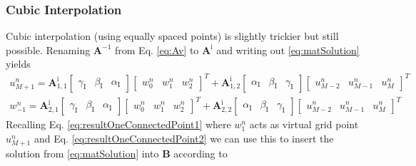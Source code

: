 \documentclass[dvipsnames]{article}
\begin{document}
\subsubsection{Cubic Interpolation}
Cubic interpolation (using equally spaced points) is slightly trickier but still possible. Renaming $\mathbf{A}^{-1}$ from Eq. \eqref{eq:Av} to $\mathbf{A}^\text{i}$ and writing out \eqref{eq:matSolution} yields
\begin{align}
    u_{M+1}^n = \mathbf{A}^\text{i}_{1, 1}\begin{bmatrix}
   \gamma_\text{I} & \beta_\text{I} & \alpha_\text{I}
    \end{bmatrix} \begin{bmatrix}
   w_0^n & w_1^n &w_2^n
    \end{bmatrix}^T + \mathbf{A}^\text{i}_{1, 2}\begin{bmatrix}
   \alpha_\text{I} & \beta_\text{I} & \gamma_\text{I}
    \end{bmatrix} \begin{bmatrix}
   u_{M-2}^n & u_{M-1}^n &u_M^n
    \end{bmatrix}^T\\
    w_{-1}^n = \mathbf{A}^\text{i}_{2, 1}\begin{bmatrix}
   \gamma_\text{I} & \beta_\text{I} & \alpha_\text{I}
    \end{bmatrix} \begin{bmatrix}
   w_0^n & w_1^n &w_2^n
    \end{bmatrix}^T + \mathbf{A}^\text{i}_{2, 2}\begin{bmatrix}
   \alpha_\text{I} & \beta_\text{I} & \gamma_\text{I}
    \end{bmatrix} \begin{bmatrix}
   u_{M-2}^n & u_{M-1}^n &u_M^n
    \end{bmatrix}^T
\end{align}
Recalling Eq. \eqref{eq:resultOneConnectedPoint1} where $w_1^n$ acts as virtual grid point $u_{M+1}^n$ and Eq. \eqref{eq:resultOneConnectedPoint2}
we can use this to insert the solution from \eqref{eq:matSolution} into $\mathbf{B}$ according to
\end{document}

